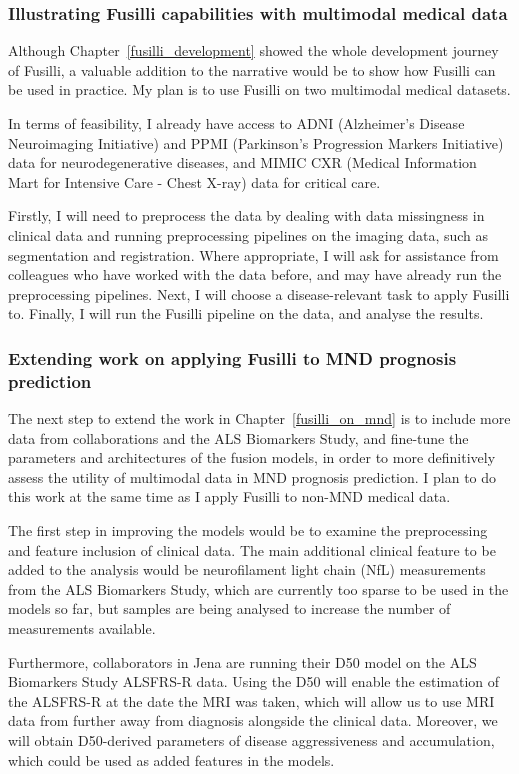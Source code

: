 \subsubsection*{Illustrating Fusilli capabilities with multimodal medical data}

Although Chapter~\ref{fusilli_development} showed the whole development journey of Fusilli, a valuable addition to the narrative would be to show how Fusilli can be used in practice.
My plan is to use Fusilli on two multimodal medical datasets.

In terms of feasibility, I already have access to ADNI (Alzheimer's Disease Neuroimaging Initiative) and PPMI (Parkinson's Progression Markers Initiative) data for neurodegenerative diseases, and MIMIC CXR (Medical Information Mart for Intensive Care - Chest X-ray) data for critical care.

Firstly, I will need to preprocess the data by dealing with data missingness in clinical data and running preprocessing pipelines on the imaging data, such as segmentation and registration.
Where appropriate, I will ask for assistance from colleagues who have worked with the data before, and may have already run the preprocessing pipelines.
Next, I will choose a disease-relevant task to apply Fusilli to.
Finally, I will run the Fusilli pipeline on the data, and analyse the results.

\subsubsection*{Extending work on applying Fusilli to MND prognosis prediction}

The next step to extend the work in Chapter~\ref{fusilli_on_mnd} is to include more data from collaborations and the ALS Biomarkers Study, and fine-tune the parameters and architectures of the fusion models, in order to more definitively assess the utility of multimodal data in MND prognosis prediction.
I plan to do this work at the same time as I apply Fusilli to non-MND medical data.

The first step in improving the models would be to examine the preprocessing and feature inclusion of clinical data.
The main additional clinical feature to be added to the analysis would be neurofilament light chain (NfL) measurements from the ALS Biomarkers Study, which are currently too sparse to be used in the models so far, but samples are being analysed to increase the number of measurements available.

Furthermore, collaborators in Jena are running their D50 model on the ALS Biomarkers Study ALSFRS-R data.
Using the D50 will enable the estimation of the ALSFRS-R at the date the MRI was taken, which will allow us to use MRI data from further away from diagnosis alongside the clinical data.
Moreover, we will obtain D50-derived parameters of disease aggressiveness and accumulation, which could be used as added features in the models.

